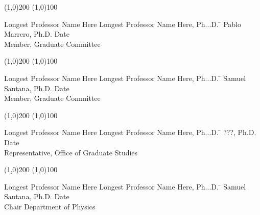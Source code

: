 \noindent
\line(1,0){200} \hspace{40 mm} \line(1,0){100}\\
\noindent
\vspace{-1.75\baselineskip}
\begin{tabbing}
	Longest Professor Name Here Longest Professor Name Here, Ph...D. \=  \kill
	Pablo Marrero, Ph.D. \>  Date\\Member, Graduate Committee
\end{tabbing}


\noindent
\line(1,0){200} \hspace{40 mm} \line(1,0){100}\\
\noindent
\vspace{-1.75\baselineskip}
\begin{tabbing}
	Longest Professor Name Here Longest Professor Name Here, Ph...D.   \=  \kill
	Samuel Santana, Ph.D. \>  Date\\Member, Graduate Committee
\end{tabbing}

\noindent
\line(1,0){200} \hspace{40 mm} \line(1,0){100}\\
\noindent
\vspace{-1.75\baselineskip}
\begin{tabbing}
	Longest Professor Name Here Longest Professor Name Here, Ph...D.   \=  \kill
	???, Ph.D. \>  Date\\Representative, Office of Graduate Studies
\end{tabbing}

\noindent
\line(1,0){200} \hspace{40 mm} \line(1,0){100}\\
\noindent
\vspace{-1.75\baselineskip}
\begin{tabbing}
	Longest Professor Name Here Longest Professor Name Here, Ph...D.   \=  \kill
	Samuel Santana, Ph.D. \>  Date\\Chair Department of Physics
\end{tabbing}
